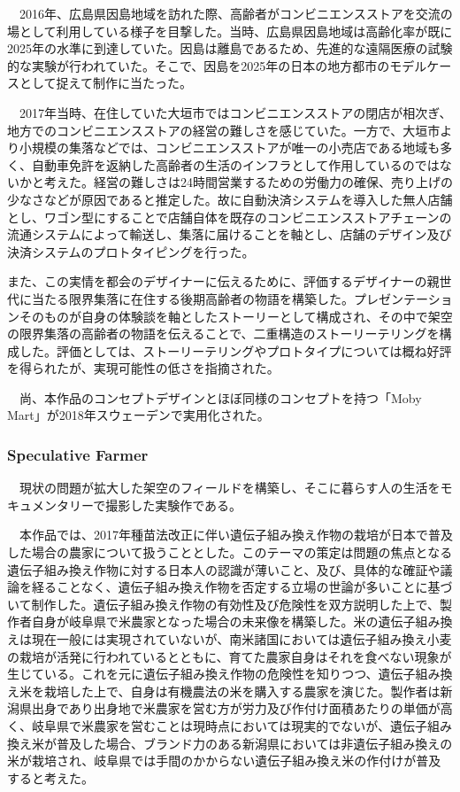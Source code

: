 　2016年、広島県因島地域を訪れた際、高齢者がコンビニエンスストアを交流の場として利用している様子を目撃した。当時、広島県因島地域は高齢化率が既に2025年の水準に到達していた。因島は離島であるため、先進的な遠隔医療の試験的な実験が行われていた。そこで、因島を2025年の日本の地方都市のモデルケースとして捉えて制作に当たった。

　2017年当時、在住していた大垣市ではコンビニエンスストアの閉店が相次ぎ、地方でのコンビニエンスストアの経営の難しさを感じていた。一方で、大垣市より小規模の集落などでは、コンビニエンスストアが唯一の小売店である地域も多く、自動車免許を返納した高齢者の生活のインフラとして作用しているのではないかと考えた。経営の難しさは24時間営業するための労働力の確保、売り上げの少なさなどが原因であると推定した。故に自動決済システムを導入した無人店舗とし、ワゴン型にすることで店舗自体を既存のコンビニエンスストアチェーンの流通システムによって輸送し、集落に届けることを軸とし、店舗のデザイン及び決済システムのプロトタイピングを行った。

 また、この実情を都会のデザイナーに伝えるために、評価するデザイナーの親世代に当たる限界集落に在住する後期高齢者の物語を構築した。プレゼンテーションそのものが自身の体験談を軸としたストーリーとして構成され、その中で架空の限界集落の高齢者の物語を伝えることで、二重構造のストーリーテリングを構成した。評価としては、ストーリーテリングやプロトタイプについては概ね好評を得られたが、実現可能性の低さを指摘された。

　尚、本作品のコンセプトデザインとほぼ同様のコンセプトを持つ「Moby Mart」が2018年スウェーデンで実用化された。

\subsubsection{Speculative Farmer}

　現状の問題が拡大した架空のフィールドを構築し、そこに暮らす人の生活をモキュメンタリーで撮影した実験作である。

　本作品では、2017年種苗法改正に伴い遺伝子組み換え作物の栽培が日本で普及した場合の農家について扱うこととした。このテーマの策定は問題の焦点となる遺伝子組み換え作物に対する日本人の認識が薄いこと、及び、具体的な確証や議論を経ることなく、遺伝子組み換え作物を否定する立場の世論が多いことに基づいて制作した。遺伝子組み換え作物の有効性及び危険性を双方説明した上で、製作者自身が岐阜県で米農家となった場合の未来像を構築した。米の遺伝子組み換えは現在一般には実現されていないが、南米諸国においては遺伝子組み換え小麦の栽培が活発に行われているとともに、育てた農家自身はそれを食べない現象が生じている。これを元に遺伝子組み換え作物の危険性を知りつつ、遺伝子組み換え米を栽培した上で、自身は有機農法の米を購入する農家を演じた。製作者は新潟県出身であり出身地で米農家を営む方が労力及び作付け面積あたりの単価が高く、岐阜県で米農家を営むことは現時点においては現実的でないが、遺伝子組み換え米が普及した場合、ブランド力のある新潟県においては非遺伝子組み換えの米が栽培され、岐阜県では手間のかからない遺伝子組み換え米の作付けが普及すると考えた。

